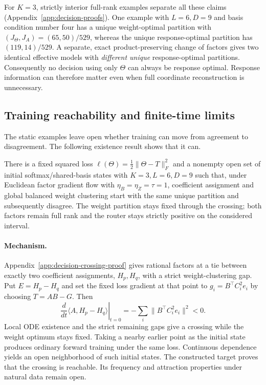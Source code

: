 For $K=3$, strictly interior full-rank examples separate all these claims
(Appendix~\ref{app:decision-proofs}). One example with $L=6,D=9$ and
basis condition number four has a unique weight-optimal partition with
$(J_\Theta,J_A)=(65,50)/529$, whereas the unique response-optimal
partition has $(119,14)/529$. A separate, exact product-preserving change
of factors gives two identical effective models with \emph{different unique}
response-optimal partitions. Consequently no decision using only $\Theta$
can always be response optimal. Response information can therefore matter even when full coordinate
reconstruction is unnecessary.

\subsection{Training reachability and finite-time limits}

The static examples leave open whether training can move from agreement
to disagreement. The following existence result shows that it can.

\begin{theorem}
\label{thm:decision-crossing}
There is a fixed squared loss $\ell(\Theta)=\tfrac12\|\Theta-T\|_F^2$
and a nonempty open set of initial softmax/shared-basis states with
$K=3,L=6,D=9$ such that, under Euclidean factor gradient flow with
$\eta_B=\eta_Z=\tau=1$, coefficient assignment and global balanced weight
clustering start with the same unique partition and subsequently disagree.
The weight partition stays fixed through the crossing; both factors remain
full rank and the router stays strictly positive on the considered interval.
\end{theorem}

\paragraph{Mechanism.}
Appendix~\ref{app:decision-crossing-proof} gives rational factors at a tie
between exactly two coefficient assignments, $H_p,H_q$, with a strict
weight-clustering gap. Put $E=H_p-H_q$ and set the fixed loss gradient at
that point to $g_i=B^\top C_i^2 e_i$ by choosing $T=AB-G$. Then
\begin{equation}
 \left.\frac{d}{dt}\langle A,H_p-H_q\rangle\right|_{t=0}
 =-\sum_i\|B^\top C_i^2e_i\|^2<0. \label{eq:crossing-speed}
\end{equation}
Local ODE existence and the strict remaining gaps give a crossing while
the weight optimum stays fixed. Taking a nearby earlier point as the
initial state produces ordinary forward training under the same loss.
Continuous dependence yields an open neighborhood of such initial states.
The constructed target proves that the crossing is reachable. Its
frequency and attraction properties under natural data remain open.


